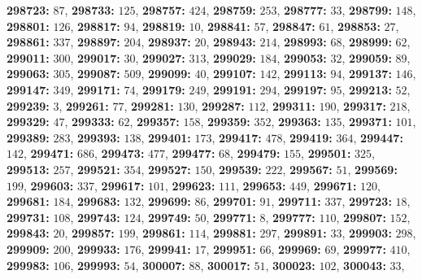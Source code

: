\textsf{\bfseries 298723:} $87$, \textsf{\bfseries 298733:} $125$, \textsf{\bfseries 298757:} $424$, \textsf{\bfseries 298759:} $253$, \textsf{\bfseries 298777:} $33$, \textsf{\bfseries 298799:} $148$, \textsf{\bfseries 298801:} $126$, \textsf{\bfseries 298817:} $94$, \textsf{\bfseries 298819:} $10$, \textsf{\bfseries 298841:} $57$, \textsf{\bfseries 298847:} $61$, \textsf{\bfseries 298853:} $27$, \textsf{\bfseries 298861:} $337$, \textsf{\bfseries 298897:} $204$, \textsf{\bfseries 298937:} $20$, \textsf{\bfseries 298943:} $214$, \textsf{\bfseries 298993:} $68$, \textsf{\bfseries 298999:} $62$, \textsf{\bfseries 299011:} $300$, \textsf{\bfseries 299017:} $30$, \textsf{\bfseries 299027:} $313$, \textsf{\bfseries 299029:} $184$, \textsf{\bfseries 299053:} $32$, \textsf{\bfseries 299059:} $89$, \textsf{\bfseries 299063:} $305$, \textsf{\bfseries 299087:} $509$, \textsf{\bfseries 299099:} $40$, \textsf{\bfseries 299107:} $142$, \textsf{\bfseries 299113:} $94$, \textsf{\bfseries 299137:} $146$, \textsf{\bfseries 299147:} $349$, \textsf{\bfseries 299171:} $74$, \textsf{\bfseries 299179:} $249$, \textsf{\bfseries 299191:} $294$, \textsf{\bfseries 299197:} $95$, \textsf{\bfseries 299213:} $52$, \textsf{\bfseries 299239:} $3$, \textsf{\bfseries 299261:} $77$, \textsf{\bfseries 299281:} $130$, \textsf{\bfseries 299287:} $112$, \textsf{\bfseries 299311:} $190$, \textsf{\bfseries 299317:} $218$, \textsf{\bfseries 299329:} $47$, \textsf{\bfseries 299333:} $62$, \textsf{\bfseries 299357:} $158$, \textsf{\bfseries 299359:} $352$, \textsf{\bfseries 299363:} $135$, \textsf{\bfseries 299371:} $101$, \textsf{\bfseries 299389:} $283$, \textsf{\bfseries 299393:} $138$, \textsf{\bfseries 299401:} $173$, \textsf{\bfseries 299417:} $478$, \textsf{\bfseries 299419:} $364$, \textsf{\bfseries 299447:} $142$, \textsf{\bfseries 299471:} $686$, \textsf{\bfseries 299473:} $477$, \textsf{\bfseries 299477:} $68$, \textsf{\bfseries 299479:} $155$, \textsf{\bfseries 299501:} $325$, \textsf{\bfseries 299513:} $257$, \textsf{\bfseries 299521:} $354$, \textsf{\bfseries 299527:} $150$, \textsf{\bfseries 299539:} $222$, \textsf{\bfseries 299567:} $51$, \textsf{\bfseries 299569:} $199$, \textsf{\bfseries 299603:} $337$, \textsf{\bfseries 299617:} $101$, \textsf{\bfseries 299623:} $111$, \textsf{\bfseries 299653:} $449$, \textsf{\bfseries 299671:} $120$, \textsf{\bfseries 299681:} $184$, \textsf{\bfseries 299683:} $132$, \textsf{\bfseries 299699:} $86$, \textsf{\bfseries 299701:} $91$, \textsf{\bfseries 299711:} $337$, \textsf{\bfseries 299723:} $18$, \textsf{\bfseries 299731:} $108$, \textsf{\bfseries 299743:} $124$, \textsf{\bfseries 299749:} $50$, \textsf{\bfseries 299771:} $8$, \textsf{\bfseries 299777:} $110$, \textsf{\bfseries 299807:} $152$, \textsf{\bfseries 299843:} $20$, \textsf{\bfseries 299857:} $199$, \textsf{\bfseries 299861:} $114$, \textsf{\bfseries 299881:} $297$, \textsf{\bfseries 299891:} $33$, \textsf{\bfseries 299903:} $298$, \textsf{\bfseries 299909:} $200$, \textsf{\bfseries 299933:} $176$, \textsf{\bfseries 299941:} $17$, \textsf{\bfseries 299951:} $66$, \textsf{\bfseries 299969:} $69$, \textsf{\bfseries 299977:} $410$, \textsf{\bfseries 299983:} $106$, \textsf{\bfseries 299993:} $54$, \textsf{\bfseries 300007:} $88$, \textsf{\bfseries 300017:} $51$, \textsf{\bfseries 300023:} $102$, \textsf{\bfseries 300043:} $33$, 

